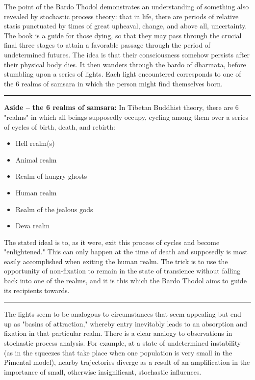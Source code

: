 The point of the Bardo Thodol demonstrates an understanding of something also revealed by stochastic process theory: that in life, there are periods of relative stasis punctuated by times of great upheaval, change, and above all, uncertainty. The book is a guide for those dying, so that they may pass through the crucial final three stages to attain a favorable passage through the period of undetermined futures. The idea is that their consciousness somehow persists after their physical body dies. It then wanders through the bardo of dharmata, before stumbling upon a series of lights. Each light encountered corresponds to one of the 6 realms of samsara in which the person might find themselves born.

\vspace{5pt} \hrule \vspace{5pt}

\noindent \textbf{Aside -- the 6 realms of samsara: } In Tibetan Buddhist theory, there are 6 "realms" in which all beings supposedly occupy, cycling among them over a series of cycles of birth, death, and rebirth:

\begin{itemize} \item Hell realm(s) \item Animal realm \item Realm of hungry ghosts \item Human realm \item Realm of the jealous gods \item Deva realm \end{itemize}

The stated ideal is to, as it were, exit this process of cycles and become "enlightened." This can only happen at the time of death and supposedly is most easily accomplished when exiting the human realm. The trick is to use the opportunity of non-fixation to remain in the state of transience without falling back into one of the realms, and it is this which the Bardo Thodol aims to guide its recipients towards.

\vspace{5pt} \hrule \vspace{5pt}

The lights seem to be analogous to circumstances that seem appealing but end up as "basins of attraction," whereby entry inevitably leads to an absorption and fixation in that particular realm. There is a clear analogy to observations in stochastic process analysis. For example, at a state of undetermined instability (as in the squeezes that take place when one population is very small in the Pimental model), nearby trajectories diverge as a result of an amplification in the importance of small, otherwise insignificant, stochastic influences.

